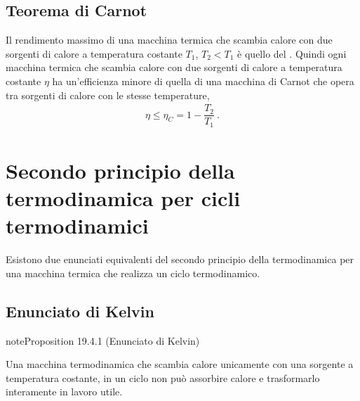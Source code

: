 \documentclass[letterpaper,10pt,italian]{jupyterBook}
\begin{document}
\subsection{Teorema di Carnot}
\label{\detokenize{ch/thermodynamics/heat-engine-carnot:teorema-di-carnot}}\label{\detokenize{ch/thermodynamics/heat-engine-carnot:physics-hs-thermodynamics-heat-engine-carnot-td-cycle-theorem}}
\sphinxAtStartPar
Il rendimento massimo di una macchina termica che scambia calore con due sorgenti di calore a temperatura costante \(T_1\), \(T_2 < T_1\) è quello del {\hyperref[\detokenize{ch/thermodynamics/heat-engine-carnot:physics-hs-thermodynamics-heat-engine-carnot-td-cycle}]{}}. Quindi ogni macchina termica che scambia calore con due sorgenti di calore a temperatura costante \(\eta\) ha un’efficienza minore di quella di una macchina di Carnot che opera tra sorgenti di calore con le stesse temperature,
\begin{equation*}
\begin{split}\eta \le \eta_C = 1 - \dfrac{T_2}{T_1} \ .\end{split}
\end{equation*}
\sphinxstepscope


\section{Secondo principio della termodinamica per cicli termodinamici}
\label{\detokenize{ch/thermodynamics/heat-engine-second-principle:secondo-principio-della-termodinamica-per-cicli-termodinamici}}\label{\detokenize{ch/thermodynamics/heat-engine-second-principle:physics-hs-thermodynamics-heat-engine-second-principle}}\label{\detokenize{ch/thermodynamics/heat-engine-second-principle::doc}}
\sphinxAtStartPar
Esistono due enunciati equivalenti del secondo principio della termodinamica per una macchina termica che realizza un ciclo termodinamico.


\subsection{Enunciato di Kelvin}
\label{\detokenize{ch/thermodynamics/heat-engine-second-principle:enunciato-di-kelvin}}\label{\detokenize{ch/thermodynamics/heat-engine-second-principle:physics-hs-thermodynamics-heat-engine-second-principle-kelvin}}\label{ch/thermodynamics/heat-engine-second-principle:proposition-0}
\begin{sphinxadmonition}{note}{Proposition 19.4.1 (Enunciato di Kelvin)}



\sphinxAtStartPar
Una macchina termodinamica che scambia calore unicamente con una sorgente a temperatura costante, in un ciclo non può assorbire calore e trasformarlo interamente in lavoro utile.
\end{sphinxadmonition}
\end{document}
